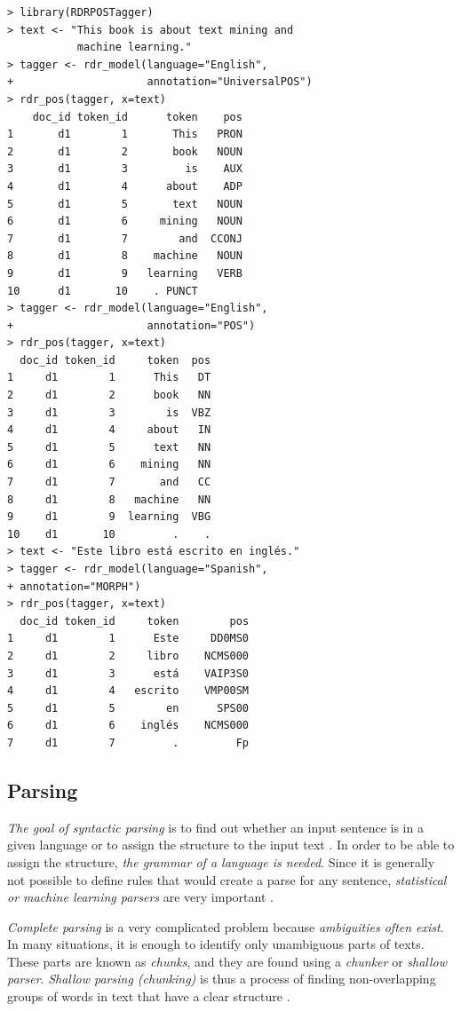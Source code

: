 \documentclass[11pt,openany,executivepaper]{book}
\begin{document}
\begin{verbatim}
> library(RDRPOSTagger)
> text <- "This book is about text mining and
           machine learning."
> tagger <- rdr_model(language="English",
+                     annotation="UniversalPOS")
> rdr_pos(tagger, x=text)
    doc_id token_id      token    pos
1       d1        1       This   PRON
2       d1        2       book   NOUN
3       d1        3         is    AUX
4       d1        4      about    ADP
5       d1        5       text   NOUN
6       d1        6     mining   NOUN
7       d1        7        and  CCONJ
8       d1        8    machine   NOUN
9       d1        9   learning   VERB
10      d1       10    . PUNCT  
> tagger <- rdr_model(language="English",
+                     annotation="POS")
> rdr_pos(tagger, x=text)
  doc_id token_id     token  pos
1     d1        1      This   DT
2     d1        2      book   NN
3     d1        3        is  VBZ
4     d1        4     about   IN
5     d1        5      text   NN
6     d1        6    mining   NN
7     d1        7       and   CC
8     d1        8   machine   NN
9     d1        9  learning  VBG
10    d1       10         .    .
> text <- "Este libro está escrito en inglés."
> tagger <- rdr_model(language="Spanish",
+ annotation="MORPH")
> rdr_pos(tagger, x=text)
  doc_id token_id     token        pos
1     d1        1      Este     DD0MS0
2     d1        2     libro    NCMS000
3     d1        3      está    VAIP3S0
4     d1        4   escrito    VMP00SM
5     d1        5        en      SPS00
6     d1        6    inglés    NCMS000
7     d1        7         .         Fp
\end{verbatim}

\subsection{Parsing}

\textit{The goal of syntactic parsing} is to find out whether an input sentence is in a given language or to assign the structure to the input text \cite{206}. In order to be able to assign the structure, \textit{the grammar of a language is needed}. Since it is generally not possible to define rules that would create a parse for any sentence, \textit{statistical or machine learning parsers} are very important \cite{54}.

\textit{Complete parsing} is a very complicated problem because \textit{ambiguities often exist}. In many situations, it is enough to identify only unambiguous parts of texts. These parts are known as \textit{chunks}, and they are found using a \textit{chunker} or \textit{shallow parser}. \textit{Shallow parsing (chunking)} is thus a process of finding non-overlapping groups of words in text that have a clear structure \cite{2}.
\end{document}
